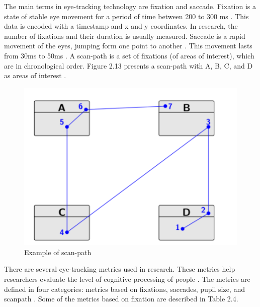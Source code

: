 The main terms in eye-tracking technology are fixation and saccade. 
Fixation is a state of stable eye movement for a period of time between 200 to 300 ms \cite{sharafi2015systematic}. This data is encoded with a timestamp and x and y coordinates. 
In research, the number of fixations and their duration is usually measured. Saccade is a rapid movement of the eyes, jumping form one point to another \cite{andrzejewska2020development}.
This movement lasts from 30ms to 50ms \cite{obaidellah2018survey}. A scan-path is a set of fixations (of areas of interest), which are in chronological order. Figure 2.13  presents a scan-path with A, B, C, and D as areas of interest  \cite{sharafi2015systematic}.

\begin{figure} [H]
  \centering
  \includegraphics[scale=1.1]{figures/scanp.png}
  \caption{Example of scan-path \cite[p. 4]{sharafi2015systematic}}
  \label{fig:AnhangsChor}
\end{figure}


 
There are several eye-tracking metrics used in research. These metrics help researchers evaluate the level of cognitive processing of people \cite{obaidellah2018survey}. The metrics are defined in four categories: metrics based on fixations,
saccades, pupil size, and scanpath \cite{sharafi2015eye}. Some of the metrics based on fixation are described in Table 2.4.

